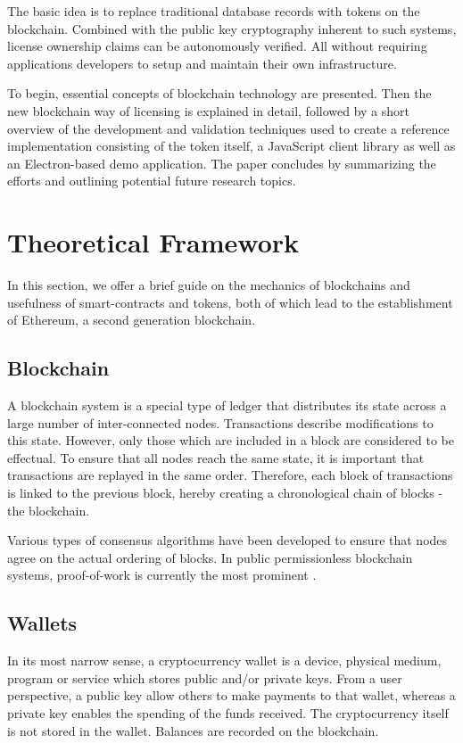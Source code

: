 \documentclass{egpubl}
\begin{document}
The basic idea is to replace traditional database records with tokens on the blockchain. Combined with the public key cryptography inherent to such systems, license ownership claims can be autonomously verified. All without requiring applications developers to setup and maintain their own infrastructure.
 
To begin, essential concepts of blockchain technology are presented. Then the new blockchain way of licensing is explained in detail, followed by a short overview of the development and validation techniques used to create a reference implementation consisting of the token itself, a JavaScript client library as well as an Electron-based demo application. The paper concludes by summarizing the efforts and outlining potential future research topics.


\section{Theoretical Framework}
In this section, we offer a brief guide on the mechanics of blockchains and usefulness of smart-contracts and tokens, both of which lead to the establishment of Ethereum, a second generation blockchain.  

\subsection{Blockchain}
A blockchain system is a special type of ledger that distributes its state across a large number of inter-connected nodes. Transactions describe modifications to this state. However, only those which are included in a block are considered to be effectual. To ensure that all nodes reach the same state, it is important that transactions are replayed in the same order. Therefore, each block of transactions is linked to the previous block, hereby creating a chronological chain of blocks - the blockchain. 

Various types of consensus algorithms have been developed to ensure that nodes agree on the actual ordering of blocks. In public permissionless blockchain systems, proof-of-work is currently the most prominent \cite{yim2018blockchain}.

\subsection{Wallets}
In its most narrow sense, a cryptocurrency wallet is a device, physical medium, program or service which stores public and/or private keys. From a user perspective, a public key allow others to make payments to that wallet, whereas a private key enables the spending of the funds received. The cryptocurrency itself is not stored in the wallet. Balances are recorded on the blockchain.
\end{document}
